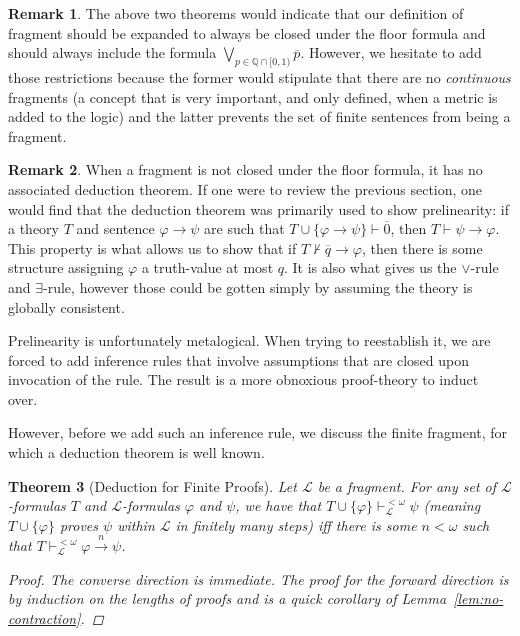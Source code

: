 \documentclass{amsart}
\newtheorem{theorem}{Theorem}[section]
\theoremstyle{definition}
\newtheorem{remark}[theorem]{Remark}
\numberwithin{equation}{theorem}
\renewcommand{\phi}{\varphi}
\newcommand{\Q}{\mathbb{Q}}
\newcommand{\proves}{\vdash}
\newcommand{\rat}[1]{{\overline{#1}}}
\newcommand{\narrow}[1]{\xrightarrow{#1}}
\renewcommand{\to}{\narrow{}}
\newcommand{\frag}{\mathcal{L}}
\begin{document}
\begin{remark}
  The above two theorems would indicate that our definition of fragment should be expanded to always be closed under the floor formula and should always include the formula $\bigvee_{p\in\Q\cap[0,1)}\rat p$.
  However, we hesitate to add those restrictions because the former would stipulate that there are no \emph{continuous} fragments (a concept that is very important, and only defined, when a metric is added to the logic) and the latter prevents the set of finite sentences from being a fragment.
\end{remark}
\begin{remark}
  When a fragment is not closed under the floor formula, it has no associated deduction theorem.
  If one were to review the previous section, one would find that the deduction theorem was primarily used to show prelinearity: if a theory $T$ and sentence $\phi\to\psi$ are such that $T\cup\{\phi\to\psi\}\proves\rat 0$, then $T\proves\psi\to\phi$.
  This property is what allows us to show that if $T\not\proves\rat q\to\phi$, then there is some structure assigning $\phi$ a truth-value at most $q$.
  It is also what gives us the $\vee$-rule and $\exists$-rule, however those could be gotten simply by assuming the theory is globally consistent.

  Prelinearity is unfortunately metalogical.
  When trying to reestablish it, we are forced to add inference rules that involve assumptions that are closed upon invocation of the rule.
  The result is a more obnoxious proof-theory to induct over.
  
  However, before we add such an inference rule, we discuss the finite fragment, for which a deduction theorem is well known.
\end{remark}
\begin{theorem}[Deduction for Finite Proofs]\label{thm:deduction-finite}
  Let $\frag$ be a fragment.
  For any set of $\frag$-formulas $T$ and $\frag$-formulas $\phi$ and $\psi$, we have that $T\cup\{\phi\}\proves_\frag^{<\omega}\psi$ (meaning $T\cup\{\phi\}$ proves $\psi$ within $\frag$ in finitely many steps) iff there is some $n<\omega$ such that $T\proves_\frag^{<\omega}\phi\narrow{n}\psi$.
  \begin{proof}
      The converse direction is immediate.
      The proof for the forward direction is by induction on the lengths of proofs and is a quick corollary of Lemma~\ref{lem:no-contraction}.
  \end{proof}
\end{theorem}
\end{document}
